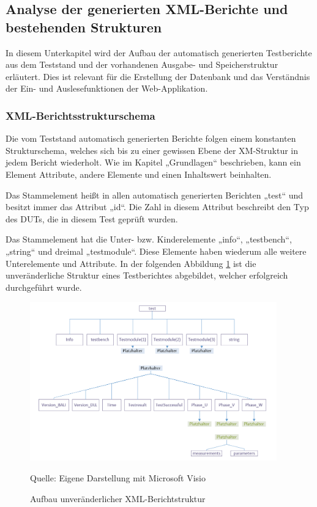 \subsection{Analyse der generierten XML-Berichte und bestehenden Strukturen}
\label{subsec:analyse-der-generierten-xml-berichte-und-bestehenden-strukturen}

In diesem Unterkapitel wird der Aufbau der automatisch
generierten Testberichte aus dem Teststand und der vorhandenen Ausgabe- und Speicherstruktur
erläutert. Dies ist relevant für die Erstellung der Datenbank und das
Verständnis der Ein- und Auslesefunktionen der Web-Applikation.

\subsubsection{XML-Berichtsstrukturschema}

Die vom Teststand automatisch generierten
Berichte folgen einem konstanten Strukturschema, welches sich bis zu einer
gewissen Ebene der XM-Struktur in jedem Bericht wiederholt. Wie im Kapitel „Grundlagen“
beschrieben, kann ein Element Attribute, andere Elemente und einen Inhaltswert beinhalten.

Das Stammelement heißt in allen automatisch
generierten Berichten „test“ und besitzt immer das Attribut „id“. Die Zahl in
diesem Attribut beschreibt den Typ des \ac{DUTs}, die in diesem Test geprüft wurden.

Das Stammelement hat die Unter- bzw.
Kinderelemente „info“, „testbench“, „string“ und dreimal „testmodule“.
Diese Elemente haben wiederum alle weitere Unterelemente und Attribute.
In der folgenden Abbildung \ref{fig: Aufbau unveränderlicher XML-Berichtstruktur} ist die unveränderliche Struktur eines Testberichtes abgebildet, welcher erfolgreich durchgeführt wurde.

\begin{figure}[H]
    \centering
    \includegraphics[width=0.95\textwidth]{Grafiken/XML-Strukturdiagramm}
    \caption{Aufbau unveränderlicher XML-Berichtstruktur}
    \label{fig: Aufbau unveränderlicher XML-Berichtstruktur}
    {Quelle: Eigene Darstellung mit Microsoft Visio}
\end{figure}

